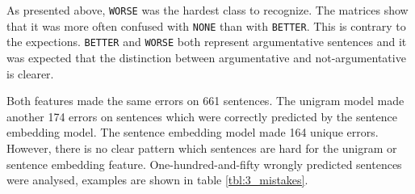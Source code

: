 As presented above, \texttt{WORSE} was the hardest class to recognize. The matrices show that it was more often confused with \texttt{NONE} than with \texttt{BETTER}. This is contrary to the expections. \texttt{BETTER} and \texttt{WORSE} both represent argumentative sentences and it was expected that the distinction between argumentative and not-argumentative is clearer. 

Both features made the same errors on 661 sentences. The unigram model made another 174 errors on sentences which were correctly predicted by the sentence embedding model. The sentence embedding model made 164 unique errors. However, there is no clear pattern which sentences are hard for the unigram or sentence embedding feature. One-hundred-and-fifty wrongly predicted sentences were analysed, examples are shown in table \ref{tbl:3_mistakes}. 

